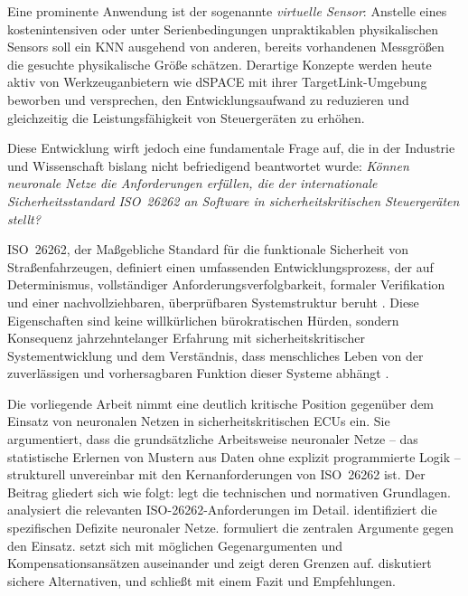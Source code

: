 ﻿\documentclass[12pt,a4paper]{article}
\begin{document}
Eine prominente Anwendung ist der sogenannte \emph{virtuelle Sensor}: Anstelle eines
kostenintensiven oder unter Serienbedingungen unpraktikablen physikalischen Sensors
soll ein KNN ausgehend von anderen, bereits vorhandenen Messgr\"o\ss{}en die gesuchte
physikalische Gr\"o\ss{}e sch\"atzen. Derartige Konzepte werden heute aktiv von
Werkzeuganbietern wie dSPACE mit ihrer TargetLink-Umgebung beworben und versprechen,
den Entwicklungsaufwand zu reduzieren und gleichzeitig die Leistungsf\"ahigkeit von
Steuerger\"aten zu erh\"ohen.

Diese Entwicklung wirft jedoch eine fundamentale Frage auf, die in der Industrie und
Wissenschaft bislang nicht befriedigend beantwortet wurde: \emph{K\"onnen neuronale
Netze die Anforderungen erf\"ullen, die der internationale Sicherheitsstandard
ISO~26262 an Software in sicherheitskritischen Steuerger\"aten stellt?}

ISO~26262, der Ma\ss{}gebliche Standard f\"ur die funktionale Sicherheit von
Stra\ss{}enfahrzeugen, definiert einen umfassenden Entwicklungsprozess, der auf
Determinismus, vollst\"andiger Anforderungsverfolgbarkeit, formaler Verifikation und
einer nachvollziehbaren, \"uberpr\"ufbaren Systemstruktur beruht \cite{iso26262_1}.
Diese Eigenschaften sind keine willk\"urlichen b\"urokratischen H\"urden, sondern
Konsequenz jahrzehntelanger Erfahrung mit sicherheitskritischer Systementwicklung und
dem Verst\"andnis, dass menschliches Leben von der zuverl\"assigen und vorhersagbaren
Funktion dieser Systeme abh\"angt \cite{Leveson2011}.

Die vorliegende Arbeit nimmt eine deutlich kritische Position gegen\"uber dem Einsatz
von neuronalen Netzen in sicherheitskritischen ECUs ein. Sie argumentiert, dass die
grunds\"atzliche Arbeitsweise neuronaler Netze -- das statistische Erlernen von
Mustern aus Daten ohne explizit programmierte Logik -- strukturell unvereinbar mit den
Kernanforderungen von ISO~26262 ist. Der Beitrag gliedert sich wie folgt:
 legt die technischen und normativen Grundlagen. 
analysiert die relevanten ISO-26262-Anforderungen im Detail. 
identifiziert die spezifischen Defizite neuronaler Netze. 
formuliert die zentralen Argumente gegen den Einsatz. 
setzt sich mit m\"oglichen Gegenargumenten und Kompensationsans\"atzen auseinander und
zeigt deren Grenzen auf.  diskutiert sichere Alternativen, und
 schlie\ss{}t mit einem Fazit und Empfehlungen.
\end{document}
